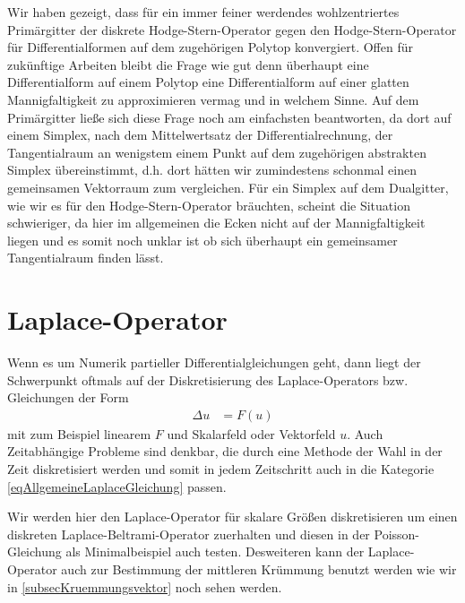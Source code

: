 \begin{fazit}
    Wir haben gezeigt, dass für ein immer feiner werdendes wohlzentriertes Primärgitter der diskrete Hodge-Stern-Operator gegen den Hodge-Stern-Operator für Differentialformen auf dem
    zugehörigen Polytop konvergiert.
    Offen für zukünftige Arbeiten bleibt die Frage wie gut denn überhaupt eine Differentialform auf einem Polytop eine Differentialform auf einer glatten Mannigfaltigkeit zu approximieren vermag
    und in welchem Sinne.
    Auf dem Primärgitter ließe sich diese Frage noch am einfachsten beantworten, da dort auf einem Simplex, nach dem Mittelwertsatz der Differentialrechnung, der Tangentialraum an
    wenigstem einem Punkt auf dem zugehörigen abstrakten Simplex übereinstimmt, d.h. dort hätten wir zumindestens schonmal einen gemeinsamen Vektorraum zum vergleichen.
    Für ein Simplex auf dem Dualgitter, wie wir es für den Hodge-Stern-Operator bräuchten, scheint die Situation schwieriger, da hier im allgemeinen die Ecken nicht auf der Mannigfaltigkeit
    liegen und es somit noch unklar ist ob sich überhaupt ein gemeinsamer Tangentialraum finden lässt.
  \end{fazit}




\section{Laplace-Operator}
  
  \begin{ziel}
    Wenn es um Numerik partieller Differentialgleichungen geht, dann liegt der Schwerpunkt oftmals auf der Diskretisierung des Laplace-Operators bzw. Gleichungen der Form
    \begin{align}
      \label{eqAllgemeineLaplaceGleichung}
      \Delta u &= F(u)
    \end{align}
    mit zum Beispiel linearem \( F \) und Skalarfeld oder Vektorfeld \( u \).
    Auch Zeitabhängige Probleme sind denkbar, die durch eine Methode der Wahl in der Zeit diskretisiert werden 
    und somit in jedem Zeitschritt auch in die Kategorie \eqref{eqAllgemeineLaplaceGleichung} passen.

    Wir werden hier den Laplace-Operator für skalare Größen diskretisieren um einen diskreten Laplace-Beltrami-Operator zuerhalten und diesen in der Poisson-Gleichung als Minimalbeispiel
    auch testen. Desweiteren kann der Laplace-Operator auch zur Bestimmung der mittleren Krümmung benutzt werden wie wir in \ref{subsecKruemmungsvektor} noch sehen werden.
  \end{ziel}

